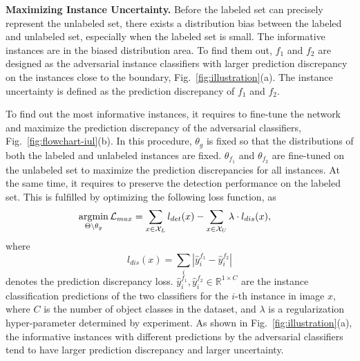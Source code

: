 \documentclass[final]{cvpr}
\DeclareMathOperator*{\argmin}{argmin}
\begin{document}
\textbf{Maximizing Instance Uncertainty.} Before the labeled set can precisely represent the unlabeled set, there exists a distribution bias between the labeled and unlabeled set, especially when the labeled set is small. The informative instances are in the biased distribution area.
To find them out, $f_1$ and $f_2$ are designed as the adversarial instance classifiers with larger prediction discrepancy on the instances close to the boundary, Fig.~\ref{fig:illustration}(a). The instance uncertainty is defined as the prediction discrepancy of $f_1$ and $f_2$.

To find out the most informative instances, it requires to fine-tune the network and maximize the prediction discrepancy of the adversarial classifiers, Fig.~\ref{fig:flowchart-iul}(b). In this procedure, $\theta_g$ is fixed so that the distributions of both the labeled and unlabeled instances are fixed. $\theta_{f_1}$ and $\theta_{f_2}$ are fine-tuned on the unlabeled set to maximize the prediction discrepancies for all instances. At the same time, it requires to preserve the detection performance on the labeled set. This is fulfilled by optimizing the following loss function, as 
\begin{equation}
    \label{eq_max_discrepancy}
    \begin{split}
    \argmin_{\Theta \setminus \theta_{g}}{\cal L}_{max} &= \sum_{x\in {\cal X}_L}l_{det}(x) - 
    \sum_{x\in {\cal X}_U} \lambda \cdot l_{dis}(x),
\end{split}
\end{equation}
where 
\begin{equation}
    \label{eq_max_discrepancy_l_dis}
    l_{dis}(x) = \sum_i |{\hat y_{i}^{f_1}} - {\hat y_{i}^{f_2}}|
\end{equation}
denotes the prediction discrepancy loss. ${\hat y_{i}^{f_1}}, {\hat y_{i}^{f_2}}\in\mathbb{R}^{1\times C}$ are the instance classification predictions of the two classifiers for the $i$-th instance in image $x$, where $C$ is the number of object classes in the dataset, and $\lambda$ is a regularization hyper-parameter determined by experiment. As shown in Fig.~\ref{fig:illustration}(a), the informative instances with different predictions by the adversarial classifiers tend to have larger prediction discrepancy and larger uncertainty.
\end{document}
